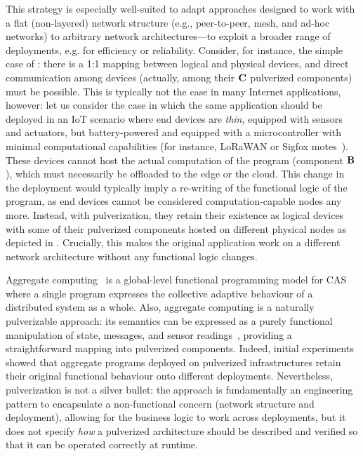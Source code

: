 This strategy is especially well-suited to adapt approaches designed to work with a flat (non-layered) network structure (e.g., peer-to-peer, mesh, and ad-hoc networks) 
 to arbitrary network architectures---to exploit a broader range of deployments, e.g. for efficiency or reliability.
%
Consider, for instance, the simple case of
:
there is a 1:1 mapping between logical and physical devices, and direct communication among devices (actually, among their $\mathbf{C}$ pulverized components) must be possible.
%
This is typically not the case in many Internet applications, however:
let us consider the case in which the same application should be deployed in an IoT scenario where end devices are \emph{thin},
equipped with sensors and actuators, but battery-powered and equipped with a microcontroller with minimal computational capabilities
(for instance, LoRaWAN or Sigfox motes~\cite{MekkiBCM18}).
%
These devices cannot host the actual computation of the program (component $\mathbf{B}$), which must necessarily be offloaded to the edge or the cloud.
%
This change in the deployment would typically imply a re-writing of the functional logic of the program,
as end devices cannot be considered computation-capable nodes any more.
%
Instead, with pulverization, they retain their existence as logical devices
with some of their pulverized components hosted on different physical nodes as depicted in
.
%
Crucially, this makes the original application work on a different network architecture without any functional logic changes.

Aggregate computing~\cite{DBLP:journals/computer/BealPV15,DBLP:journals/jlap/ViroliBDACP19}
 is a global-level functional programming model for CAS
 where a single program expresses the collective adaptive behaviour of a distributed system as a whole.
Also, aggregate computing is a naturally pulverizable approach:
its semantics can be expressed as a purely functional manipulation of state, messages, and sensor readings~\cite{DBLP:journals/jlap/ViroliBDACP19},
providing a straightforward mapping into pulverized components.
%
Indeed, initial experiments~\cite{DBLP:journals/fi/CasadeiPPVW20}
showed that aggregate programs deployed on pulverized infrastructures retain their original functional behaviour onto different deployments.
%
Nevertheless, pulverization is not a silver bullet:
the approach is fundamentally an engineering pattern to encapsulate a non-functional concern
(network structure and deployment),
allowing for the business logic to work across deployments,
but it does not specify \emph{how} 
 a pulverized architecture should be described
 and verified so that it can be operated correctly at runtime.

